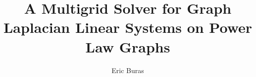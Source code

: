 \documentclass[12pt]{ruthesis}
\title{A Multigrid Solver for Graph Laplacian Linear Systems on Power Law Graphs}
\author{Eric Buras}
\begin{document}
  \begin{frontmatter}
   \maketitle
   
   
   
   \tableofcontents
   \listoffigures
   \listoftables
%   
  \end{frontmatter}


%


%
%
%
%



\end{document}
